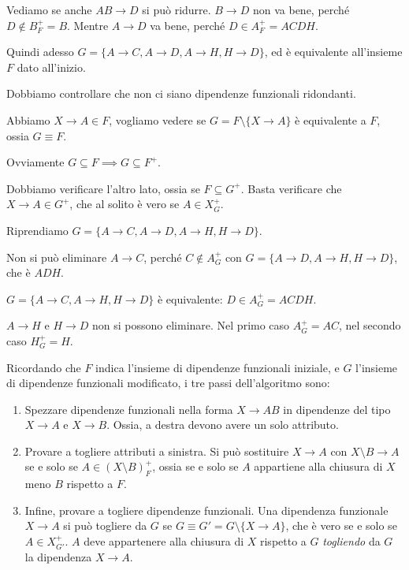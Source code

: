 Vediamo se anche $AB \to D$ si pu\`o ridurre. $B \to D$ non va bene, perch\'e $D \notin B^+_F = B$. Mentre $A \to D$ va bene, perch\'e $D \in A^+_F = ACDH$.

Quindi adesso $G = \{ A \to C, A \to D, A \to H, H \to D \}$, ed \`e equivalente all'insieme $F$ dato all'inizio.

Dobbiamo controllare che non ci siano dipendenze funzionali ridondanti.

Abbiamo $X \to A \in F$, vogliamo vedere se $G = F \setminus \{ X \to A \}$ \`e equivalente a $F$, ossia $G \equiv F$.

Ovviamente $G \subseteq F \implies G \subseteq F^+$.

Dobbiamo verificare l'altro lato, ossia se $F \subseteq G^+$. Basta verificare che $X \to A \in G^+$, che al solito \`e vero se $A \in X^+_G$.

Riprendiamo $G = \{ A \to C, A \to D, A \to H, H \to D \}$.

Non si pu\`o eliminare $A \to C$, perch\'e $C \notin A^+_G$ con $G = \{ A \to D, A \to H, H \to D \}$, che \`e $ADH$.

$G = \{ A \to C, A \to H, H \to D \}$ \`e equivalente: $D \in A^+_G = ACDH$.

$A \to H$ e $H \to D$ non si possono eliminare. Nel primo caso $A^+_G = AC$, nel secondo caso $H^+_G = H$.

Ricordando che $F$ indica l'insieme di dipendenze funzionali iniziale, e $G$ l'insieme di dipendenze funzionali modificato, i tre passi dell'algoritmo sono:
\begin{enumerate}
    \item Spezzare dipendenze funzionali nella forma $X \to AB$ in dipendenze del tipo $X \to A$ e $X \to B$. Ossia, a destra devono avere un solo attributo.
    \item Provare a togliere attributi a sinistra. Si pu\`o sostituire $X \to A$ con $X \setminus B \to A$ se e solo se $A \in (X \setminus B)^+_F$, ossia se e solo se $A$ appartiene alla chiusura di $X$ meno $B$ rispetto a $F$.
    \item Infine, provare a togliere dipendenze funzionali. Una dipendenza funzionale $X \to A$ si pu\`o togliere da $G$ se $G \equiv G' = G \setminus \{ X \to A \}$, che \`e vero se e solo se $A \in X^+_{G'}$. $A$ deve appartenere alla chiusura di $X$ rispetto a $G$ \emph{togliendo} da $G$ la dipendenza $X \to A$.
\end{enumerate}

